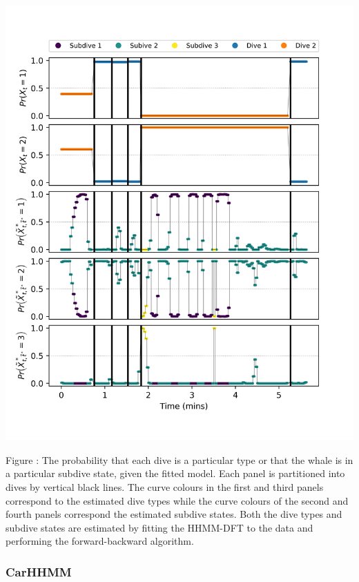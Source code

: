 \documentclass{article}
\begin{document}
        \begin{center}
        \includegraphics[width=6in]{../Plots/HHMM_decoded_states.png}
        \end{center}
        
        \noindent Figure : The probability that each dive is a particular type or that the whale is in a particular subdive state, given the fitted model. Each panel is partitioned into dives by vertical black lines. The curve colours in the first and third panels correspond to the estimated dive types while the curve colours of the second and fourth panels correspond the estimated subdive states. Both the dive types and subdive states are estimated by fitting the HHMM-DFT to the data and performing the forward-backward algorithm.
        \addtocounter{fignum}{1}
        
        \subsubsection{CarHHMM}
        
\end{document}
